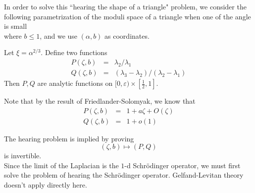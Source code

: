 In order to solve this ``hearing the shape of a triangle" problem, we consider
the following parametrization of the moduli space of a triangle when one of the
angle is small
\\%
where $b\leqslant 1$, and we use $(\alpha, b)$ as coordinates.
\begin{conjecture}
Let $\xi = \alpha^{2/3}$. Define two functions
\begin{eqnarray}
\nonumber P(\zeta, b) & = & \lambda_2 / \lambda_1 \\
\nonumber Q(\zeta, b) & = & (\lambda_3 - \lambda_2)/(\lambda_2 - \lambda_1)
\end{eqnarray}
Then $P,Q$ are analytic functions on $[0, \varepsilon) \times[\frac{1}{2}, 1]$.
\end{conjecture}

Note that by the result of Friedlander-Solomyak, we know that
\begin{eqnarray}
\nonumber P(\zeta, b) & = & 1 + a\zeta + O(\zeta) \\
\nonumber Q(\zeta, b) & = & 1 + o(1)
\end{eqnarray}

The hearing problem is implied by proving
\[
(\zeta, b) \mapsto (P,Q)
\]
is invertible.
\\

Since the limit of the Laplacian is the $1$-d Schr\"{o}dinger operator, we must
first solve the problem of hearing the Schr\"{o}dinger operator. Gelfand-Levitan
theory doesn't apply directly here.


